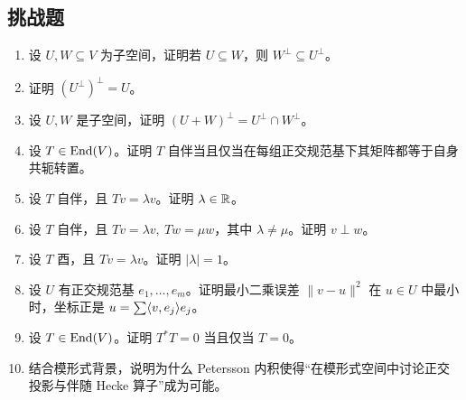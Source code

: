\subsection*{挑战题}
\begin{enumerate}[resume, label=\textbf{\arabic*.}, leftmargin=*, itemsep=0.5em]
\item \hard 设 $U,W\subseteq V$ 为子空间，证明若 $U\subseteq W$，则 $W^{\perp}\subseteq U^{\perp}$。
\item \hard 证明 $(U^{\perp})^{\perp}=U$。
\item \hard 设 $U,W$ 是子空间，证明 $(U+W)^{\perp}=U^{\perp}\cap W^{\perp}$。
\item \hard 设 $T\in\mathrm{End}(V)$。证明 $T$ 自伴当且仅当在每组正交规范基下其矩阵都等于自身共轭转置。
\item \hard 设 $T$ 自伴，且 $Tv=\lambda v$。证明 $\lambda\in\mathbb{R}$。
\item \hard 设 $T$ 自伴，且 $Tv=\lambda v,\ Tw=\mu w$，其中 $\lambda\neq\mu$。证明 $v\perp w$。
\item \hard 设 $T$ 酉，且 $Tv=\lambda v$。证明 $|\lambda|=1$。
\item \hard 设 $U$ 有正交规范基 $e_1,\dots,e_m$。证明最小二乘误差 $\|v-u\|^2$ 在 $u\in U$ 中最小时，坐标正是 $u=\sum \langle v, e_j \rangle e_j$。
\item \hard 设 $T\in\mathrm{End}(V)$。证明 $T^*T=0$ 当且仅当 $T=0$。
\item \hard 结合模形式背景，说明为什么 Petersson 内积使得“在模形式空间中讨论正交投影与伴随 Hecke 算子”成为可能。
\end{enumerate}

